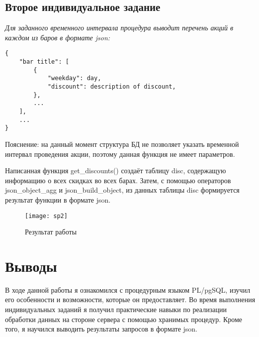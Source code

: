 \subsection{Второе индивидуальное задание}
\textit{Для заданного временного интервала процедура выводит перечень акций в каждом из баров в формате json:}
\begin{lstlisting}
{
	"bar title": [
		{
			"weekday": day,
			"discount": description of discount,
		},
		...
	],
	...
}
\end{lstlisting}

Пояснение: на данный момент структура БД не позволяет указать временной интервал проведения акции, поэтому данная функция не имеет параметров.

Написанная функция get\_discounts() создаёт таблицу disc, содержащую информащию о всех скидках во всех барах.
Затем, с помощью операторов json\_object\_agg и json\_build\_object, из данных таблицы disc формируется результат функции в формате json.



\begin{figure}[H]
	\begin{center}
		\texttt{[image: sp2]}
		\caption{Результат работы} 
		\label{pic:2} %
	\end{center}
\end{figure}

\section{Выводы}
В ходе данной работы я ознакомился с процедурным языком PL/pgSQL, изучил его особенности и возможности, которые он предоставляет. Во время выполнения индивидуальных заданий я получил практические навыки по реализации обработки данных на стороне сервера с помощью хранимых процедур. Кроме того, я научился выводить результаты запросов в формате json.

